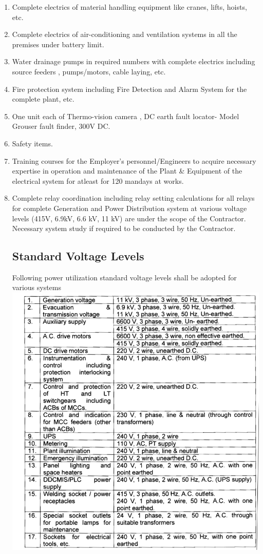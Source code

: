 \documentclass[english,11pt]{report}
\begin{document}
\begin{enumerate}
\item Complete electrics of material handling equipment like cranes, lifts,
hoists, etc.

\item Complete electrics of air-conditioning and ventilation systems in all the
premises under battery limit.

\item Water drainage pumps in required numbers with complete electrics
including source feeders , pumps/motors, cable laying, etc.


\item Fire protection system including Fire Detection and Alarm System for the
complete plant, etc.

\item One unit each of Thermo-vision camera , DC earth fault locator- Model
Grouser fault finder, 300V DC.

\item Safety items.
\item Training courses for the Employer's personnel/Engineers to acquire
necessary expertise in operation and maintenance of the Plant &
Equipment of the electrical system for atleast for 120 mandays at works.

\item Complete relay coordination including relay setting calculations for all
relays for complete Generation and Power Distribution system at various voltage levels (415V, 6.9kV, 6.6 kV, 11 kV) are under the scope of the Contractor. Necessary system study if required to be conducted by the Contractor.\\
\newpage
\subsection{Standard Voltage Levels}
Following power utilization standard voltage levels shall be adopted for various systems\\
\includegraphics[width = 6in]{stanvoltlevel.png}

\end{enumerate}
\end{document}

